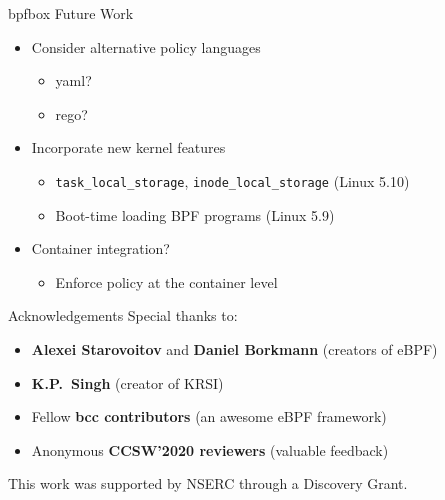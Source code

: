 \documentclass[12pt, dvipsnames, aspectratio=169]{beamer}
\begin{document}
\begin{frame}[c]{bpfbox Future Work}
\begin{itemize}
    \item Consider alternative policy languages
    \begin{itemize}
        \item yaml?
        \item rego?
    \end{itemize}
    \vfill
    \item Incorporate new kernel features
    \begin{itemize}
        \item \texttt{task\_local\_storage}, \texttt{inode\_local\_storage} (Linux 5.10)
        \item Boot-time loading BPF programs (Linux 5.9)
    \end{itemize}
    \vfill
    \item Container integration?
    \begin{itemize}
        \item Enforce policy at the container level
    \end{itemize}
\end{itemize}
\end{frame}

\begin{frame}[c]{Acknowledgements}
Special thanks to:
\begin{itemize}
    \item \textbf{Alexei Starovoitov} and \textbf{Daniel Borkmann} (creators of eBPF)
    \item \textbf{K.P.~Singh} (creator of KRSI)
    \item Fellow \textbf{bcc contributors} (an awesome eBPF framework)
    \item Anonymous \textbf{CCSW'2020 reviewers} (valuable feedback)
\end{itemize}
\vfill
This work was supported by NSERC through a Discovery Grant.
\end{frame}
\end{document}
